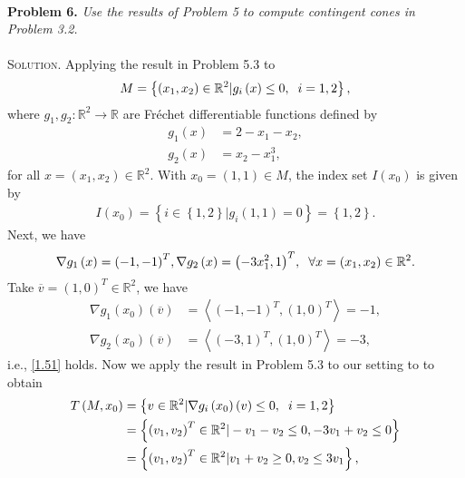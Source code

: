 \documentclass[a4paper]{article}
\numberwithin{equation}{section}
\begin{document}
\\
\textbf{Problem 6.} \textit{Use the results of Problem 5 to compute contingent cones in Problem 3.2.}\\
\\
\textsc{Solution.} Applying the result in Problem 5.3 to 
\begin{align}
M = \left\{ {\left( {{x_1},{x_2}} \right) \in {\mathbb{R}^2}|{g_i}\left( x \right) \le 0,\hspace{0.2cm} i = 1,2} \right\},
\end{align}
where ${g_1},{g_2}:{\mathbb{R}^2} \to \mathbb{R}$ are Fr\'{e}chet differentiable functions defined by
\begin{align}
{g_1}\left( x \right) &= 2 - {x_1} - {x_2},\\
{g_2}\left( x \right) &= {x_2} - x_1^3,
\end{align}
for all $x=\left(x_1,x_2\right) \in \mathbb{R}^2$. With $x_0=\left(1,1\right)\in M$, the index set $I\left(x_0\right)$ is given by
\begin{align}
I\left( {{x_0}} \right) = \left\{ {i \in \left\{ {1,2} \right\}|{g_i}\left( {1,1} \right) = 0} \right\} = \left\{ {1,2} \right\}.
\end{align} 
Next, we have 
\begin{align}
\nabla {g_1}\left( x \right) = {\left( { - 1, - 1} \right)^T},\nabla {g_2}\left( x \right) = {\left( { - 3x_1^2,1} \right)^T},\hspace{0.2cm} \forall x = \left( {{x_1},{x_2}} \right) \in {\mathbb{R}^2}.
\end{align}
Take $\overline v=\left(1,0\right)^T \in \mathbb{R}^2$, we have
\begin{align}
\nabla {g_1}\left( {{x_0}} \right)\left( {\overline v } \right) &= \left\langle {{{\left( { - 1, - 1} \right)}^T},{{\left( {1,0} \right)}^T}} \right\rangle  =  - 1,\\
\nabla {g_2}\left( {{x_0}} \right)\left( {\overline v } \right) &= \left\langle {{{\left( { - 3,1} \right)}^T},{{\left( {1,0} \right)}^T}} \right\rangle  =  - 3,
\end{align}
i.e., \eqref{1.51} holds. Now we apply the result in Problem 5.3 to our setting to to obtain
\begin{align}
T\left( {M,{x_0}} \right) &= \left\{ {v \in {\mathbb{R}^2}|\nabla {g_i}\left( {{x_0}} \right)\left( v \right) \le 0,\hspace{0.2cm} i = 1,2} \right\}\\
& = \left\{ {{{\left( {{v_1},{v_2}} \right)}^T} \in {\mathbb{R}^2}| - {v_1} - {v_2} \le 0, - 3{v_1} + {v_2} \le 0} \right\}\\
 &= \left\{ {{{\left( {{v_1},{v_2}} \right)}^T} \in {\mathbb{R}^2}|{v_1} + {v_2} \ge 0,{v_2} \le 3{v_1}} \right\},
\end{align}
\end{document}
